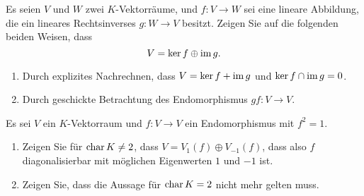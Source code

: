 \begin{question}[subtitle = Direkte Summen durch Splits]{3}
  Es seien $V$ und $W$ zwei $K$-Vektorräume, und $f \colon V \to W$ sei eine lineare Abbildung, die ein lineares Rechtsinverses $g \colon W \to V$ besitzt.
  Zeigen Sie auf die folgenden beiden Weisen, dass
  \[
    V = \ker f \oplus \operatorname{im} g.
  \]
  \begin{enumerate}[leftmargin=*]
    \item
      Durch explizites Nachrechnen, dass $V = \ker f + \operatorname{im} g$ und $\ker f \cap \operatorname{im} g = 0$.
    \item
      Durch geschickte Betrachtung des Endomorphismus $gf \colon V \to V$.
  \end{enumerate}
\end{question}


\begin{question}[subtitle = Diagonalisierbarkeit involutiver Endomorphismen]{3}
  Es sei $V$ ein $K$-Vektorraum und $f \colon V \to V$ ein Endomorphismus mit $f^2 = 1$.
  \begin{enumerate}[leftmargin=*]
    \item
      Zeigen Sie für $\operatorname{char} K \neq 2$, dass $V = V_1(f) \oplus V_{-1}(f)$, dass also $f$ diagonalisierbar mit möglichen Eigenwerten $1$ und $-1$ ist.
    \item
      Zeigen Sie, dass die Aussage für $\operatorname{char} K = 2$ nicht mehr gelten muss.
  \end{enumerate}
\end{question}



